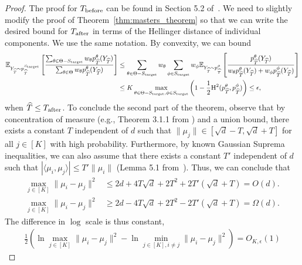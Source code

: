 \gaussianrandommeans*
\begin{proof}
The proof for $T_{\mathrm{before}}$ can be found in Section 5.2 of~\citep{li2024criticalwindowsnonasymptotictheory}. We need to slightly modify the proof of Theorem~\ref{thm:masters_theorem} so that we can write the desired bound for $T_{\mathrm{after}}$ in terms of the Hellinger distance of individual components. We use the same notation. By convexity, we can bound
\begin{align*}
\mathbb{E}_{Y_{\widehat{T}} \sim p^{S_{\mathrm{target}}}_{\widehat{T}}}\left[ \frac{\sum_{\theta \in \Theta-S_{\mathrm{target}}} w_\theta p^\theta_{\widehat{T}}(Y_{\widehat{T}})}{\sum_{\theta \in \Theta} w_\theta p^\theta_{\widehat{T}}(Y_{\widehat{T}})} \right] &\leq \sum_{\theta \in \Theta-S_{\mathrm{target}}} w_\theta  \sum_{\phi \in S_{\mathrm{target}}} w_\phi  \mathbb{E}_{Y_{\widehat{T}} \sim p^{\phi}_{\widehat{T}}} \left[ \frac{p^\theta_{\widehat{T}}(Y_{\widehat{T}})}{w_\theta p^\theta_{\widehat{T}}(Y_{\widehat{T}})+w_\phi p^\phi_{\widehat{T}}(Y_{\widehat{T}})} \right]\\
&\leq K \max_{\theta \in \Theta-S_{\mathrm{target}},\phi \in S_{\mathrm{target}}} \left(1-\frac{1}{2}\mathrm{H}^2(p^\theta_{\widehat{T}},p^\phi_{\widehat{T}})\right) \leq \epsilon,
\end{align*}
when $\widehat{T} \leq T_{\mathrm{after}}$. To conclude the second part of the theorem, observe that by concentration of measure (e.g., Theorem 3.1.1 from \citep{vershynin_high-dimensional_2018}) and a union bound, there exists a constant $T$ independent of $d$ such that $\|\mu_j\| \in [\sqrt{d}-T,\sqrt{d}+T]$ for all $j \in [K]$ with high probability. Furthermore, by known Gaussian Suprema inequalities, we can also assume that there exists a constant $T'$ independent of $d$ such that $|\langle \mu_i,\mu_j\rangle| \leq T'\|\mu_i\|$ (Lemma 5.1 from~\citep{Handel2016}). Thus, we can conclude that \begin{align*}
\max_{j \in [K]} \|\mu_i-\mu_j\|^2 &\leq 2d+4T\sqrt{d}+2T^2+2T'(\sqrt{d}+T) = O(d).\\
\max_{j \in [K]} \|\mu_i-\mu_j\|^2 &\geq 2d-4T\sqrt{d}+2T^2-2T'(\sqrt{d}+T) = \Omega(d).
\end{align*}
The difference in $\log$ scale is thus constant,
\begin{align*}
\frac{1}{2}\left(\ln \max_{j \in [K]} \|\mu_i-\mu_j\|^2  -\ln \min_{j \in [K],i\ne j} \|\mu_i-\mu_j\|^2  \right) = O_{K,\epsilon}(1)
\end{align*}
\end{proof}


